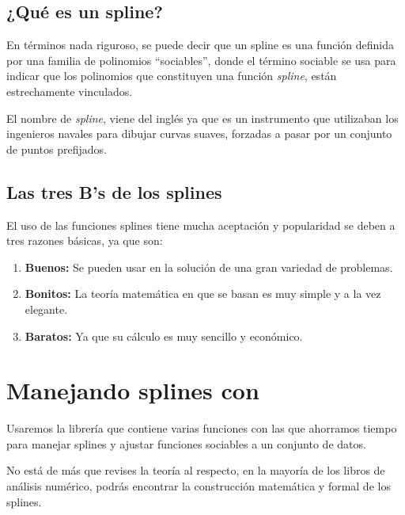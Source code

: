 \subsection{¿Qué es un spline?}
En términos nada riguroso, se puede decir que un spline es una función definida por una familia de polinomios \enquote{sociables}, donde el término sociable se usa para indicar que los polinomios que constituyen una función \emph{spline}, están estrechamente vinculados.
\par
El nombre de \emph{spline}, viene del inglés ya que es un instrumento que utilizaban los ingenieros navales para dibujar curvas suaves, forzadas a pasar por un conjunto de puntos prefijados.
\subsection{Las tres B's de los splines}
El uso de las funciones splines tiene mucha aceptación y popularidad se deben a tres razones básicas, ya que son:
\begin{enumerate}
\item \textbf{Buenos:} Se  pueden usar en la solución de una gran variedad de problemas.
\item \textbf{Bonitos:} La teoría matemática en que se basan es muy simple y a la vez elegante.
\item \textbf{Baratos:} Ya que su cálculo es muy sencillo y económico.
\end{enumerate}
\section{Manejando splines con \python}
Usaremos la librería  que contiene varias funciones con las que ahorramos tiempo para manejar splines y ajustar funciones sociables a un conjunto de datos.
\par
 No está de más que revises la teoría al respecto, en la mayoría de los libros de análisis numérico, podrás encontrar la construcción matemática y formal de los splines.
